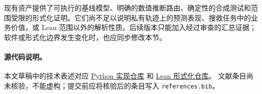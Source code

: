 \documentclass[UTF8,11pt]{ctexart}
\begin{document}
现有资产提供了可执行的基线模型、明确的数值推断路由、确定性的合成测试和范围受限的形式化证明。它们尚不足以说明私有轨迹上的预测表现、搜救任务中的业务价值，或 Lean 范围以外的解析性质。后续版本只能加入经过审查的汇总证据；软件或形式化边界发生变化时，也应同步修改本节。

\paragraph{源代码说明。} 本文草稿中的技术表述对应
\href{https://github.com/HuAzurestar/learnable-sde-for-movement-prediction}{Python 实现仓库}
和 \href{https://github.com/HuAzurestar/learnable-sde-theory-to-predict-movement}{Lean 形式化仓库}。
文献条目尚未核验，不能虚构；提交前应将核验后的条目写入 \texttt{references.bib}。
\end{document}
